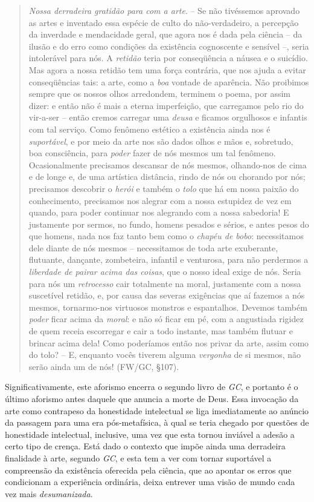 \documentclass[
	12pt,				%
	openright,			%
	oneside,			%
	a4paper,			%
	english,			%
	french,				%
	spanish,			%
	brazil				%
	]{abntex2}
\begin{document}
\begin{quotation}
\textit{Nossa derradeira gratidão para com a arte}. – Se não tivéssemos aprovado as artes e inventado essa espécie de culto do não-verdadeiro, a percepção da inverdade e mendacidade geral, que agora nos é dada pela ciência – da ilusão e do erro como condições da existência cognoscente e sensível –, seria intolerável para nós. A \textit{retidão} teria por conseqüência a náusea e o suicídio. Mas agora a nossa retidão tem uma força contrária, que nos ajuda a evitar conseqüências tais: a arte, como a \textit{boa} vontade de aparência. Não proibimos sempre que os nossos olhos arredondem, terminem o poema, por assim dizer: e então não é mais a eterna imperfeição, que carregamos pelo rio do vir-a-ser – então cremos carregar uma \textit{deusa} e ficamos orgulhosos e infantis com tal serviço. Como fenômeno estético a existência ainda nos é \textit{suportável}, e por meio da arte nos são dados olhos e mãos e, sobretudo, boa consciência, para \textit{poder} fazer de nós mesmos um tal fenômeno. Ocasionalmente precisamos descansar de nós mesmos, olhando-nos de cima e de longe e, de uma artística distância, rindo de nós ou chorando por nós; precisamos descobrir o \textit{herói} e também o \textit{tolo} que há em nossa paixão do conhecimento, precisamos nos alegrar com a nossa estupidez de vez em quando, para poder continuar nos alegrando com a nossa sabedoria! E justamente por sermos, no fundo, homens pesados e sérios, e antes pesos do que homens, nada nos faz tanto bem como o \textit{chapéu de bobo}: necessitamos dele diante de nós mesmos – necessitamos de toda arte exuberante, flutuante, dançante, zombeteira, infantil e venturosa, para não perdermos a \textit{liberdade de pairar acima das coisas}, que o nosso ideal exige de nós. Seria para nós um \textit{retrocesso} cair totalmente na moral, justamente com a nossa suscetível retidão, e, por causa das severas exigências que aí fazemos a nós mesmos, tornarmo-nos virtuosos monstros e espantalhos. Devemos também \textit{poder} ficar acima da \textit{moral}: e não só ficar em pé, com a angustiada rigidez de quem receia escorregar e cair a todo instante, mas também flutuar e brincar acima dela! Como poderíamos então nos privar da arte, assim como do tolo? – E, enquanto vocês tiverem alguma \textit{vergonha} de si mesmos, não serão ainda um de nós! (FW/GC, §107).
\end{quotation}

Significativamente, este aforismo encerra o segundo livro de \textit{GC}, e portanto é o último aforismo antes daquele que anuncia a morte de Deus. Essa invocação da arte como contrapeso da honestidade intelectual se liga imediatamente ao anúncio da passagem para uma era pós-metafísica, à qual se teria chegado por questões de honestidade intelectual, inclusive, uma vez que esta tornou inviável a adesão a certo tipo de crença. Está dado o contexto que impõe ainda uma derradeira finalidade à arte, segundo \textit{GC}, e esta tem a ver com tornar suportável a compreensão da existência oferecida pela ciência, que ao apontar os erros que condicionam a experiência ordinária, deixa entrever uma visão de mundo cada vez mais \textit{desumanizada}.
\end{document}
